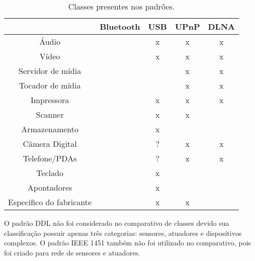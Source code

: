 \begin{table}
	\begin{center}
		\begin{tabular}{ccccc}
		\hline
									& \textbf{Bluetooth} 	& \textbf{USB}	& \textbf{UPnP} & \textbf{DLNA} \\
		\hline
		\hline
		Áudio						&						&	x			&	x 			&	x			\\
		\hline
		Vídeo						&						&	x			&	x			&	x			\\
		\hline
		Servidor de mídia			&						&				&	x 			&	x			\\
		\hline
		Tocador de mídia			&						&				&	x			&	x			\\
		\hline
		Impressora 					&						&	x			&	x			&	x			\\
		\hline
		Scanner						&						&	x			&	x			&				\\
		\hline
		Armazenamento				&						&	x			&				&				\\
		\hline
		Câmera Digital				&						&	?			&	x			&	x			\\
		\hline
		Telefone/PDAs				&						&	?			&	x			&	x			\\
		\hline
		Teclado						&						&	x			&				&				\\
		\hline
		Apontadores					&						&	x			&				&				\\
		\hline
		Específico do fabricante 	&						&	x			&	x			&				\\
		\hline								
		\end{tabular}
	\end{center}
	\caption{Classes presentes nos padrões.}
	\label{tab:comparativoClasses}
\end{table}

O padrão DDL não foi considerado no comparativo de classes devido sua classificação possuir apenas três categorias: sensores, atuadores e dispositivos complexos. O padrão IEEE 1451 também não foi utilizado no comparativo, pois foi criado para rede de sensores e atuadores.